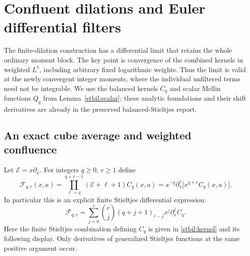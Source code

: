 \section{Confluent dilations and Euler differential filters}
\label{stce:section}

The finite-dilation construction has a differential limit that retains
the whole ordinary moment block.  The key point is convergence of the
combined kernels in weighted $L^1$, including arbitrary fixed logarithmic
weights.  Thus the limit is valid at the newly convergent integer moments,
where the individual unfiltered terms need not be integrable.
We use the balanced kernels $C_q$ and scalar Mellin functions $Q_q$ from
Lemma~\ref{stbil:scalar}; these analytic foundations and their shift
derivatives are already in the preserved balanced-Stieltjes report.

\subsection{An exact cube average and weighted confluence}

Let $\mathcal E=x\partial_x$.  For integers $q\ge0$, $r\ge1$ define
\begin{equation}\label{stce:operator}
 \mathcal F_{q,r}(x,a)
 =\prod_{\ell=q}^{q+r-1}(\mathcal E+\ell+1)C_q(x,a)
 =x^{-q}\partial_x^r\bigl[x^{q+r}C_q(x,a)\bigr].
\end{equation}
In particular this is an explicit finite Stieltjes differential expression:
\begin{equation}\label{stce:leibniz}
 \mathcal F_{q,r}
 =\sum_{j=0}^r\binom rj(q+j+1)_{r-j}x^j\partial_x^j C_q.
\end{equation}
Here the finite Stieltjes combination defining $C_q$ is given in
\eqref{stbil:kernel} and its following display.
Only derivatives of generalized Stieltjes functions at the same positive
argument occur.

